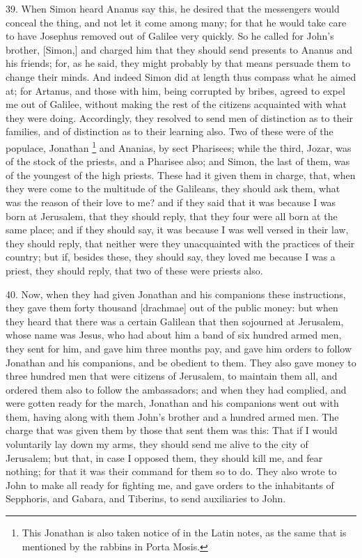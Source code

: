 39. When Simon heard Ananus say this, he desired that the messengers would
conceal the thing, and not let it come among many; for that he would take
care to have Josephus removed out of Galilee very quickly. So he called
for John's brother, [Simon,] and charged him that they should send
presents to Ananus and his friends; for, as he said, they might probably
by that means persuade them to change their minds. And indeed Simon did at
length thus compass what he aimed at; for Artanus, and those with him,
being corrupted by bribes, agreed to expel me out of Galilee, without
making the rest of the citizens acquainted with what they were doing.
Accordingly, they resolved to send men of distinction as to their
families, and of distinction as to their learning also. Two of these were
of the populace, Jonathan \footnote{This Jonathan is also
taken notice of in the Latin notes, as the same that is mentioned by the
rabbins in Porta Mosis.} and Ananias, by sect Pharisees;
while the third, Jozar, was of the stock of the priests, and a Pharisee
also; and Simon, the last of them, was of the youngest of the high
priests. These had it given them in charge, that, when they were come to
the multitude of the Galileans, they should ask them, what was the reason
of their love to me? and if they said that it was because I was born at
Jerusalem, that they should reply, that they four were all born at the
same place; and if they should say, it was because I was well versed in
their law, they should reply, that neither were they unacquainted with the
practices of their country; but if, besides these, they should say, they
loved me because I was a priest, they should reply, that two of these were
priests also.

40. Now, when they had given Jonathan and his companions these
instructions, they gave them forty thousand [drachmae] out of the public
money: but when they heard that there was a certain Galilean that then
sojourned at Jerusalem, whose name was Jesus, who had about him a band of
six hundred armed men, they sent for him, and gave him three months pay,
and gave him orders to follow Jonathan and his companions, and be obedient
to them. They also gave money to three hundred men that were citizens of
Jerusalem, to maintain them all, and ordered them also to follow the
ambassadors; and when they had complied, and were gotten ready for the
march, Jonathan and his companions went out with them, having along with
them John's brother and a hundred armed men. The charge that was given
them by those that sent them was this: That if I would voluntarily lay
down my arms, they should send me alive to the city of Jerusalem; but
that, in case I opposed them, they should kill me, and fear nothing; for
that it was their command for them so to do. They also wrote to John to
make all ready for fighting me, and gave orders to the inhabitants of
Sepphoris, and Gabara, and Tiberins, to send auxiliaries to John.

